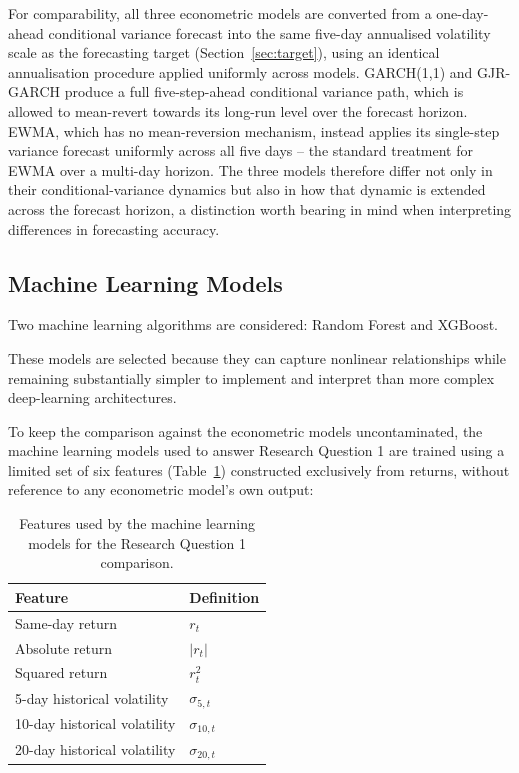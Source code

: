 \documentclass[12pt,a4paper]{article}
\begin{document}
For comparability, all three econometric models are converted from a one-day-ahead conditional
variance forecast into the same five-day annualised volatility scale as the forecasting target
(Section~\ref{sec:target}), using an identical annualisation procedure applied uniformly across
models. GARCH(1,1) and GJR-GARCH produce a full five-step-ahead conditional variance path, which is
allowed to mean-revert towards its long-run level over the forecast horizon. EWMA, which has no
mean-reversion mechanism, instead applies its single-step variance forecast uniformly across all
five days -- the standard treatment for EWMA over a multi-day horizon. The three models therefore
differ not only in their conditional-variance dynamics but also in how that dynamic is extended
across the forecast horizon, a distinction worth bearing in mind when interpreting differences in
forecasting accuracy.

\subsection{Machine Learning Models}\label{sec:ml_features}

Two machine learning algorithms are considered: Random Forest and XGBoost.

These models are selected because they can capture nonlinear relationships while remaining
substantially simpler to implement and interpret than more complex deep-learning architectures.

To keep the comparison against the econometric models uncontaminated, the machine learning models
used to answer Research Question 1 are trained using a limited set of six features
(Table~\ref{tab:ml_features_def}) constructed exclusively from returns, without reference to any
econometric model's own output:

\begin{table}[H]
\centering
\begin{tabular}{ll}
\toprule
\textbf{Feature} & \textbf{Definition} \\
\midrule
Same-day return & $r_t$ \\
Absolute return & $|r_t|$ \\
Squared return & $r_t^2$ \\
5-day historical volatility & $\sigma_{5,t}$ \\
10-day historical volatility & $\sigma_{10,t}$ \\
20-day historical volatility & $\sigma_{20,t}$ \\
\bottomrule
\end{tabular}
\caption{Features used by the machine learning models for the Research Question 1 comparison.}
\label{tab:ml_features_def}
\end{table}
\end{document}
